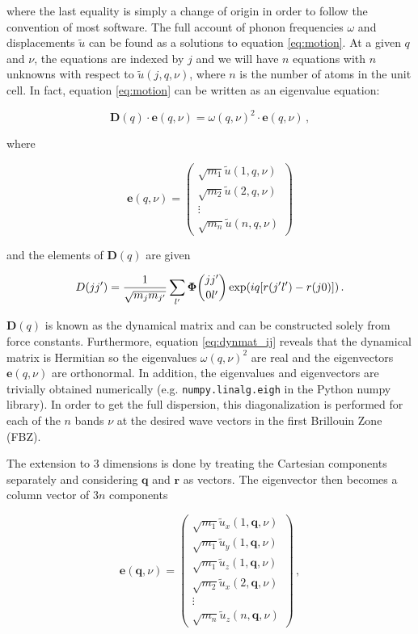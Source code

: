 \noindent where the last equality is simply a change of origin in order to follow the convention of most software. The full account of phonon frequencies $\omega$ and displacements $\tilde{u}$ can be found as a solutions to equation \eqref{eq:motion}. At a given $q$ and $\nu$, the equations are indexed by $j$ and we will have $n$ equations with $n$ unknowns with respect to $\tilde{u}(j,q,\nu)$, where $n$ is the number of atoms in the unit cell. In fact, equation \eqref{eq:motion} can be written as an eigenvalue equation:

\begin{equation}
\bm{D}(q) \cdot \bm{e}(q,\nu) = \omega(q,\nu)^2 \cdot \bm{e}(q,\nu) \, , \label{eq:dynmat}
\end{equation}

\noindent where 

\[ \bm{e}(q,\nu) = \begin{pmatrix}
\sqrt{m_1}\tilde{u}(1,q,\nu) \\
\sqrt{m_2}\tilde{u}(2,q,\nu) \\
\vdots \\
\sqrt{m_n}\tilde{u}(n,q,\nu)
\end{pmatrix} \]

\noindent and the elements of $\bm{D}(q)$ are given 

\begin{equation}
D(j\jp) = \frac{1}{\sqrt{m_j m_{\jp}}} \sum_{\lp} \fczero \exp (iq[r(\jp\lp) - r(j0)]) \, . \label{eq:dynmat_ij}
\end{equation}

\noindent $\bm{D}(q)$ is known as the dynamical matrix and can be constructed solely from force constants. Furthermore, equation \eqref{eq:dynmat_ij} reveals that the dynamical matrix is Hermitian so the eigenvalues $\omega(q,\nu)^2$ are real and the eigenvectors $\bm{e}(q, \nu)$ are orthonormal. In addition, the eigenvalues and eigenvectors are trivially obtained numerically (e.g. \texttt{numpy.linalg.eigh} in the Python numpy library). In order to get the full dispersion, this diagonalization is performed for each of the $n$ bands $\nu$ at the desired wave vectors in the first Brillouin Zone (FBZ). 

The extension to 3 dimensions is done by treating the Cartesian components separately and considering $\bm{q}$ and $\bm{r}$ as vectors. The eigenvector then becomes a column vector of $3n$ components 

\[ \bm{e}(\bm{q},\nu) = \begin{pmatrix}
\sqrt{m_1}\tilde{u}_x(1,\bm{q},\nu) \\
\sqrt{m_1}\tilde{u}_y(1,\bm{q},\nu) \\
\sqrt{m_1}\tilde{u}_z(1,\bm{q},\nu) \\
\sqrt{m_2}\tilde{u}_x(2,\bm{q},\nu) \\
\vdots \\
\sqrt{m_{n}}\tilde{u}_z(n,\bm{q},\nu)
\end{pmatrix} \, , \]

